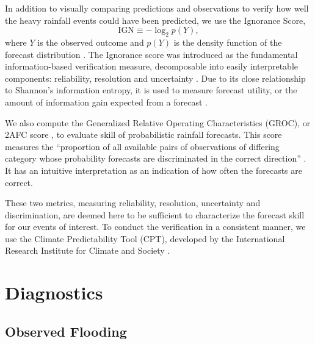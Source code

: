 \documentclass{ametsoc}
\begin{document}
In addition to visually comparing predictions and observations to verify how well the heavy rainfall events could have been predicted, we use the Ignorance Score,
\begin{equation}\label{eq:ignorance}
	\text{IGN} \equiv - \log_2 p(Y),
\end{equation}
where $Y$ is the observed outcome and $p(Y)$ is the density function of the forecast distribution \citep{Good:1952ux,Roulston:2002jz,Brocker:2007er}.
The Ignorance score was introduced as the fundamental information-based verification measure,  decomposable into easily interpretable components: reliability, resolution and uncertainty \citep{Weijs:2010cl}.
Due to its close relationship to Shannon's information entropy, it is used to measure forecast utility, or the amount of information gain expected from a forecast \citep{Roulston:2002jz}.

We also compute the Generalized Relative Operating Characteristics (GROC), or 2AFC score \citep{Mason:2009kr}, to evaluate skill of probabilistic rainfall forecasts.
This score measures the ``proportion of all available pairs of observations of differing category whose probability forecasts are discriminated in the correct direction'' \citep{Mason:2009kr}.
It has an intuitive interpretation as an indication of how often the forecasts are correct.

These two metrics, measuring reliability, resolution, uncertainty and discrimination, are deemed here to be sufficient to characterize the forecast skill for our events of interest.
To conduct the verification in a consistent manner, we use the Climate Predictability Tool (CPT), developed by the International Research Institute for Climate and Society \citep{Mason:2017gg}.


\section{Diagnostics} \label{sec:diagnostics}


\subsection{Observed Flooding} \label{sec:flood}
\end{document}
